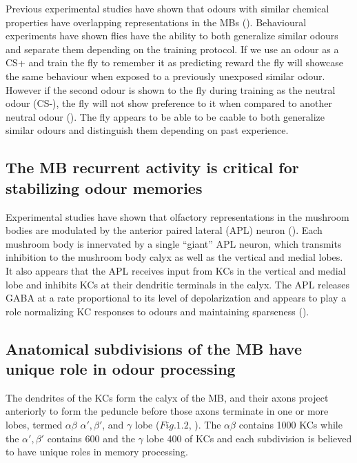 Previous experimental studies have shown that odours with similar
chemical properties have overlapping representations in the MBs (\citealp{Campbell:2013fb}).
Behavioural experiments have shown flies have the ability to both
generalize similar odours and separate them depending on the training
protocol. If we use an odour as a CS+ and train the fly to remember
it as predicting reward the fly will showcase the same behaviour when
exposed to a previously unexposed similar odour. However if the second
odour is shown to the fly during training as the neutral odour (CS-),
the fly will not show preference to it when compared to another neutral
odour (\citealp{Campbell:2013fb}). The fly appears to be able to
be caable to both generalize similar odours and distinguish them depending
on past experience.


\subsection{The MB recurrent activity is critical for stabilizing odour memories}

Experimental studies have shown that olfactory representations in
the mushroom bodies are modulated by the anterior paired lateral (APL)
neuron (\citealp{Lin:2014io}). Each mushroom body is innervated by
a single ``giant'' APL neuron, which transmits inhibition to the
mushroom body calyx as well as the vertical and medial lobes. It also
appears that the APL receives input from KCs in the vertical and medial
lobe and inhibits KCs at their dendritic terminals in the calyx. The
APL releases GABA at a rate proportional to its level of depolarization
and appears to play a role normalizing KC responses to odours and
maintaining sparseness (\citealp{Lin:2014io}). 

\subsection{Anatomical subdivisions of the MB have unique role in odour processing }

The dendrites of the KCs form the calyx of the MB, and their axons
project anteriorly to form the peduncle before those axons terminate
in one or more lobes, termed $\alpha\beta$ $\alpha',\beta'$, and
$\gamma$ lobe ($Fig.1.2$, \citealp{Krashes:2007fh}). The $\alpha\beta$
contains 1000 KCs while the $\alpha',\beta'$ contains 600 and the
$\gamma$ lobe 400 of KCs and each subdivision is believed to have
unique roles in memory processing.


